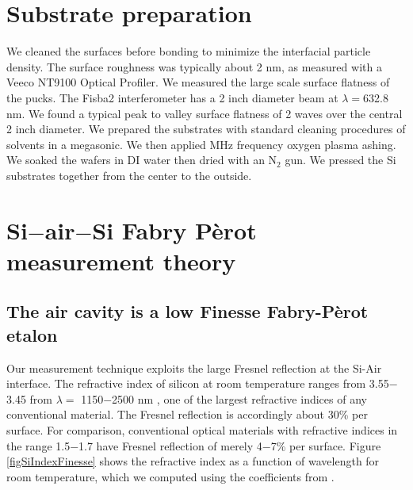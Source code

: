 \documentclass[osajnl,preprint,showpacs,superscriptaddress,12pt]{revtex4-1} %
\begin{document}
\section{Substrate preparation}
We cleaned the surfaces before bonding to minimize the interfacial particle density.  The surface roughness was typically about 2 nm, as measured with a Veeco NT9100 Optical Profiler.  We measured the large scale surface flatness of the pucks.  The Fisba2 interferometer has a 2 inch diameter beam at $\lambda=$632.8 nm.  We found a typical peak to valley surface flatness of 2 waves over the central 2 inch diameter.  We prepared the substrates with standard cleaning procedures of solvents in a megasonic.  We then applied MHz frequency oxygen plasma ashing.  We soaked the wafers in DI water then dried with an N$_2$ gun.  We pressed the Si substrates together from the center to the outside.

\section{Si$-$air$-$Si Fabry P\`{e}rot measurement theory}
\label{secTheory}


\subsection{The air cavity is a low Finesse Fabry-P\`{e}rot etalon}

Our measurement technique exploits the large Fresnel reflection \cite{2001opt4.book.....H} at the Si-Air interface.  The refractive index of silicon at room temperature ranges from 3.55$-$3.45 from $\lambda = $ 1150$-$2500 nm \cite{2006SPIE.6273E..77F}, one of the largest refractive indices of any conventional material.  The Fresnel reflection is accordingly about 30\% per surface.  For comparison, conventional optical materials with refractive indices in the range 1.5$-$1.7 have Fresnel reflection of merely 4$-$7\% per surface.  Figure \ref{figSiIndexFinesse} shows the refractive index as a function of wavelength for room temperature, which we computed using the coefficients from \cite{2006SPIE.6273E..77F}.
\end{document}

